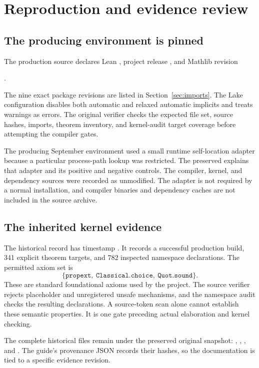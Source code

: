 \clearpage\section{Reproduction and evidence review}
\label{sec:reproduction}
\subsection{The producing environment is pinned}
The production source declares Lean , project release , and Mathlib revision
\begin{center}.\end{center}
The nine exact package revisions are listed in Section~\ref{sec:imports}. The Lake configuration disables both automatic and relaxed automatic implicits and treats warnings as errors. The original verifier checks the expected file set, source hashes, imports, theorem inventory, and kernel-audit target coverage before attempting the compiler gates.

The producing September environment used a small runtime self-location adapter because a particular process-path lookup was restricted. The preserved  explains that adapter and its positive and negative controls. The compiler, kernel, and dependency sources were recorded as unmodified. The adapter is not required by a normal installation, and compiler binaries and dependency caches are not included in the source archive.

\subsection{The inherited kernel evidence}
The historical record has timestamp . It records a successful production build, 341 explicit theorem targets, and 782 inspected namespace declarations. The permitted axiom set is
\[
\{\texttt{propext},\ \texttt{Classical.choice},\ \texttt{Quot.sound}\}.
\]
These are standard foundational axioms used by the project. The source verifier rejects placeholder and unregistered unsafe mechanisms, and the namespace audit checks the resulting declarations. A source-token scan alone cannot establish these semantic properties. It is one gate preceding actual elaboration and kernel checking.

The complete historical files remain under the preserved original snapshot: , , , and . The guide's provenance JSON records their hashes, so the documentation is tied to a specific evidence revision.

